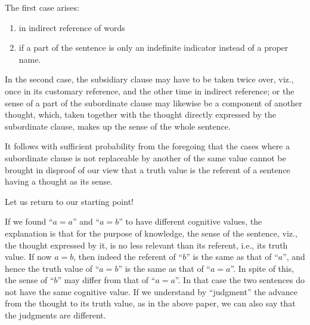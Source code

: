\documentclass[twoside,12pt]{article}
\begin{document}
The first case arises:
\begin{enumerate}[label={(\alph*)}]
\item in indirect reference of words
\item if a part of the sentence is only an indefinite indicator
  instead of a proper name.
\end{enumerate}

In the second case, the subsidiary clause may have to be taken twice
over, viz., once in its customary reference, and the other time in
indirect reference; or the sense of a part of the subordinate clause
may likewise be a component of another thought, which, taken together
with the thought directly expressed by the subordinate clause, makes
up the sense of the whole sentence.

It follows with sufficient probability from the foregoing that the
cases where a subordinate clause is not replaceable by another of the
same value cannot be brought in disproof of our view that a truth
value is the referent of a sentence having a thought as its sense.

Let us return to our starting point!

If we found ``$a=a$'' and ``$a=b$'' to have different cognitive
values, the explanation is that for the purpose of knowledge, the
sense of the sentence, viz., the thought expressed by it, is no less
relevant than its referent, i.e., its truth value. If now $a=b$, then
indeed the referent of ``$b$'' is the same as that of ``$a$'', and
hence the truth value of ``$a=b$'' is the same as that of ``$a=a$''.
In spite of this, the sense of ``$b$'' may differ from that of
``$a=a$''. In that case the two sentences do not have the same
cognitive value. If we understand by ``judgment'' the advance from
the thought to its truth value, as in the above paper, we can also say
that the judgments are different.

\end{document}
